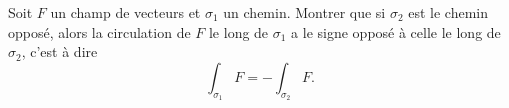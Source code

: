 
\begin{exercice}\label{exoOutilsMath-0033}

    Soit $F$ un champ de vecteurs et $\sigma_1$ un chemin. Montrer que si $\sigma_2$ est le chemin opposé, alors la circulation de $F$ le long de $\sigma_1$ a le signe opposé à celle le long de $\sigma_2$, c'est à dire
    \begin{equation}
        \int_{\sigma_1}F=-\int_{\sigma_2}F.
    \end{equation}

\end{exercice}
